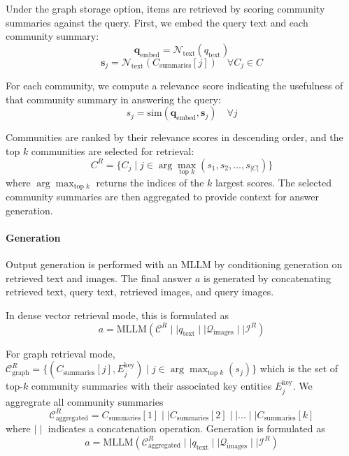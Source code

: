 Under the graph storage option, items are retrieved by scoring community summaries against the query. 
First, we embed the query text and each community summary:
\begin{equation}
    \mathbf{q}_{\text{embed}} = \mathcal{N}_{\text{text}}(q_{\text{text}})
\end{equation}
\begin{equation}
    \mathbf{s}_j = \mathcal{N}_{\text{text}}(C_{\text{summaries}}[j]) \quad \forall C_j \in C
\end{equation}

For each community, we compute a relevance score indicating the usefulness of that community summary in answering the query:
\begin{equation}
    s_j = \mathrm{sim}(\mathbf{q}_{\text{embed}}, \mathbf{s}_j) \quad \forall j
\end{equation}

Communities are ranked by their relevance scores in descending order, and the top $k$ communities are selected for retrieval:
\begin{equation}
    C^R = \{C_j \mid j \in \arg\max_{\text{top } k}(s_1, s_2, \ldots, s_{|C|})\}
\end{equation}
where $\arg\max_{\text{top } k}$ returns the indices of the $k$ largest scores.
The selected community summaries are then aggregated to provide context for answer generation.

\paragraph{Generation}
Output generation is performed with an MLLM by conditioning generation on retrieved text and images.
The final answer $a$ is generated by concatenating retrieved text, query text, retrieved images, and query images.

In dense vector retrieval mode, this is formulated as 
\begin{equation}
    a = \mathrm{MLLM}(\mathcal{C}^R \mid \mid q_{\text{text}} \mid \mid \mathcal{Q}_{\text{images}} \mid \mid  \mathcal{I}^R)
\end{equation}

For graph retrieval mode,
$\mathcal{C}^R_{\text{graph}} = \{(C_{\text{summaries}}[j], E_j^{\text{key}}) \mid j \in \arg\max_{\text{top } k}(s_j)\}$ 
which is the set of top-$k$ community summaries with their associated key entities $E_j^{\text{key}}$.
We aggregrate all community summaries
\begin{equation}
    \mathcal{C}^R_{\text{aggregated}} = C_{\text{summaries}}[1] \mid \mid C_{\text{summaries}}[2] \mid \mid ... \mid \mid C_{\text{summaries}}[k]
\end{equation}
where $\mid \mid$ indicates a concatenation operation.
Generation is formulated as
\begin{equation}
    a = \mathrm{MLLM}(\mathcal{C}^R_{\text{aggregated}} \mid \mid q_{\text{text}} \mid \mid \mathcal{Q}_{\text{images}} \mid \mid \mathcal{I}^R)
\end{equation}

